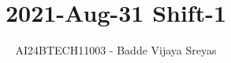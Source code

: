 \documentclass[journal]{IEEEtran}
\begin{document}

\vspace{3cm}

\title{2021-Aug-31 Shift-1}
\author{AI24BTECH11003 - Badde Vijaya Sreyas}
{\let\newpage\relax\maketitle}

\renewcommand{\thefigure}{\theenumi}
\renewcommand{\thetable}{\theenumi}
\setlength{\intextsep}{10pt} %


\renewcommand{\thetable}{\theenumi}
\end{document}
